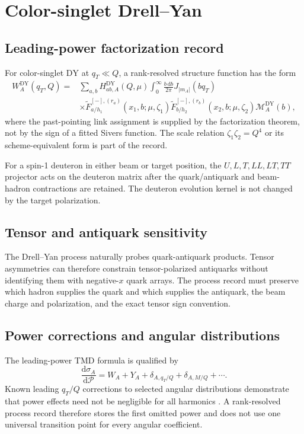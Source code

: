 \documentclass[11pt]{article}
\newcommand{\dd}{\mathrm{d}}
\newcommand{\DY}{\mathrm{DY}}
\newcommand{\cM}{\mathcal M}
\newcommand{\cP}{\mathcal P}
\begin{document}
\section{Color-singlet Drell--Yan}
\label{sec:dy}

\subsection{Leading-power factorization record}

For color-singlet \(\DY\) at \(q_T\ll Q\), a rank-resolved structure function has the form
\begin{align}
 W_A^{\DY}(q_T,Q)={}&
 \sum_{a,b}
 H_{ab,A}^{\DY}(Q,\mu)
 \int_0^\infty\frac{b\,\dd b}{2\pi}
 J_{|m_A|}(bq_T)
 \nonumber\\
 &\times
 \widetilde F_{a/h_1}^{[-],(r_a)}(x_1,b;\mu,\zeta_1)
 \widetilde F_{b/h_2}^{[-],(r_b)}(x_2,b;\mu,\zeta_2)
 \cM_A^{\DY}(b),
 \label{eq:dy-w}
\end{align}
where the past-pointing link assignment is supplied by the factorization theorem, not by the sign of a fitted Sivers function.  The scale relation \(\zeta_1\zeta_2=Q^4\) or its scheme-equivalent form is part of the record.

For a spin-1 deuteron in either beam or target position, the \(U,L,T,LL,LT,TT\) projector acts on the deuteron matrix after the quark/antiquark and beam-hadron contractions are retained.  The deuteron evolution kernel is not changed by the target polarization.

\subsection{Tensor and antiquark sensitivity}

The Drell--Yan process naturally probes quark-antiquark products.  Tensor asymmetries can therefore constrain tensor-polarized antiquarks without identifying them with negative-\(x\) quark arrays.  The process record must preserve which hadron supplies the quark and which supplies the antiquark, the beam charge and polarization, and the exact tensor sign convention.

\subsection{Power corrections and angular distributions}

The leading-power TMD formula is qualified by
\begin{equation}
 \frac{\dd\sigma_A}{\dd\cP}
 =W_A+Y_A+\delta_{A,q_T/Q}+\delta_{A,M/Q}+\cdots.
 \label{eq:dy-power}
\end{equation}
Known leading \(q_T/Q\) corrections to selected angular distributions demonstrate that power effects need not be negligible for all harmonics \cite{ArroyoCastro2025}.  A rank-resolved process record therefore stores the first omitted power and does not use one universal transition point for every angular coefficient.
\end{document}
